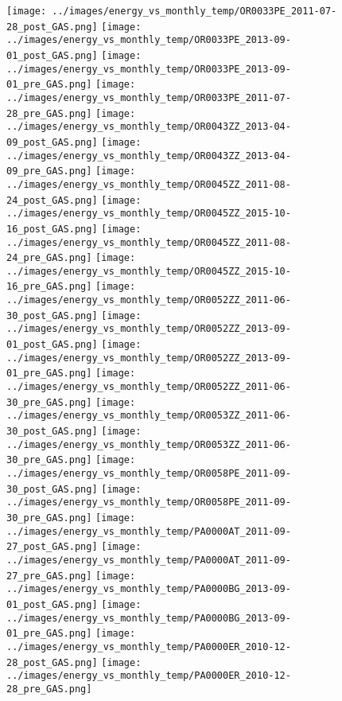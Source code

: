 \clearpage
\begin{figure}
\centering
\texttt{[image: ../images/energy\_vs\_monthly\_temp/OR0033PE\_2011-07-28\_post\_GAS.png]}
\texttt{[image: ../images/energy\_vs\_monthly\_temp/OR0033PE\_2013-09-01\_post\_GAS.png]}
\texttt{[image: ../images/energy\_vs\_monthly\_temp/OR0033PE\_2013-09-01\_pre\_GAS.png]}
\texttt{[image: ../images/energy\_vs\_monthly\_temp/OR0033PE\_2011-07-28\_pre\_GAS.png]}
\texttt{[image: ../images/energy\_vs\_monthly\_temp/OR0043ZZ\_2013-04-09\_post\_GAS.png]}
\texttt{[image: ../images/energy\_vs\_monthly\_temp/OR0043ZZ\_2013-04-09\_pre\_GAS.png]}
\texttt{[image: ../images/energy\_vs\_monthly\_temp/OR0045ZZ\_2011-08-24\_post\_GAS.png]}
\texttt{[image: ../images/energy\_vs\_monthly\_temp/OR0045ZZ\_2015-10-16\_post\_GAS.png]}
\texttt{[image: ../images/energy\_vs\_monthly\_temp/OR0045ZZ\_2011-08-24\_pre\_GAS.png]}
\texttt{[image: ../images/energy\_vs\_monthly\_temp/OR0045ZZ\_2015-10-16\_pre\_GAS.png]}
\texttt{[image: ../images/energy\_vs\_monthly\_temp/OR0052ZZ\_2011-06-30\_post\_GAS.png]}
\texttt{[image: ../images/energy\_vs\_monthly\_temp/OR0052ZZ\_2013-09-01\_post\_GAS.png]}
\texttt{[image: ../images/energy\_vs\_monthly\_temp/OR0052ZZ\_2013-09-01\_pre\_GAS.png]}
\texttt{[image: ../images/energy\_vs\_monthly\_temp/OR0052ZZ\_2011-06-30\_pre\_GAS.png]}
\texttt{[image: ../images/energy\_vs\_monthly\_temp/OR0053ZZ\_2011-06-30\_post\_GAS.png]}
\texttt{[image: ../images/energy\_vs\_monthly\_temp/OR0053ZZ\_2011-06-30\_pre\_GAS.png]}
\texttt{[image: ../images/energy\_vs\_monthly\_temp/OR0058PE\_2011-09-30\_post\_GAS.png]}
\texttt{[image: ../images/energy\_vs\_monthly\_temp/OR0058PE\_2011-09-30\_pre\_GAS.png]}
\texttt{[image: ../images/energy\_vs\_monthly\_temp/PA0000AT\_2011-09-27\_post\_GAS.png]}
\texttt{[image: ../images/energy\_vs\_monthly\_temp/PA0000AT\_2011-09-27\_pre\_GAS.png]}
\texttt{[image: ../images/energy\_vs\_monthly\_temp/PA0000BG\_2013-09-01\_post\_GAS.png]}
\texttt{[image: ../images/energy\_vs\_monthly\_temp/PA0000BG\_2013-09-01\_pre\_GAS.png]}
\texttt{[image: ../images/energy\_vs\_monthly\_temp/PA0000ER\_2010-12-28\_post\_GAS.png]}
\texttt{[image: ../images/energy\_vs\_monthly\_temp/PA0000ER\_2010-12-28\_pre\_GAS.png]}
\end{figure}
